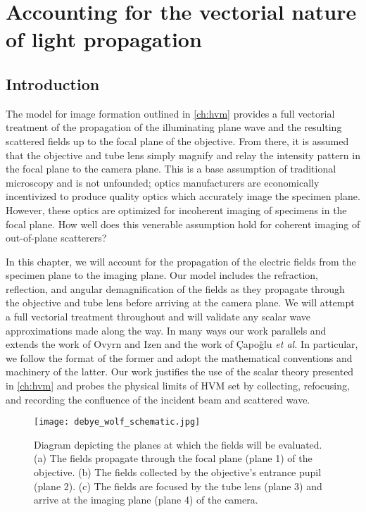 \chapter{Accounting for the vectorial nature of light propagation}
\label{ch:debye}




\section{Introduction}

The model for image formation outlined in \autoref{ch:hvm} provides a full
vectorial treatment of the propagation of the illuminating plane wave and
the resulting scattered fields up to the focal plane of the objective.
From there, it is assumed that the objective and tube lens simply magnify and
relay the intensity pattern in the focal plane to the camera plane.
This is a base assumption of traditional microscopy and is not unfounded; optics
manufacturers are economically incentivized to produce quality optics which
accurately image the specimen plane. However, these optics are optimized for
incoherent imaging of specimens in the focal plane.
How well does this venerable assumption hold for coherent imaging of out-of-plane
scatterers?

In this chapter, we will account for the propagation of the electric fields from
the specimen plane to the imaging plane. Our model includes the
refraction, reflection, and angular demagnification of the fields as they propagate
through the objective and tube lens before arriving at the camera plane.
We will attempt a full vectorial treatment throughout and will
validate any scalar wave approximations made along the way. In many ways our work
parallels and extends the work of Ovyrn and Izen\cite{izen00} and the work of
\c{C}apo\u{g}lu\cite{capoglu12} \emph{et al.} In particular, we follow the format of the
former and adopt the mathematical conventions and machinery of the latter.
Our work justifies the use of the scalar theory presented in \autoref{ch:hvm} and
probes the physical limits of HVM set by collecting, refocusing, and recording
the confluence of the incident beam and scattered wave.


\begin{figure}
  \centering
  \texttt{[image: debye\_wolf\_schematic.jpg]}
  \caption{Diagram depicting the planes at which the fields will be evaluated.
    (a) The fields propagate through the focal plane (plane 1) of the objective.
    (b) The fields collected by the objective's entrance pupil (plane 2).
    (c) The fields are focused by the tube lens (plane 3) and arrive at the
    imaging plane (plane 4) of the camera.}
  \label{fig:debye_schematic}
\end{figure}


